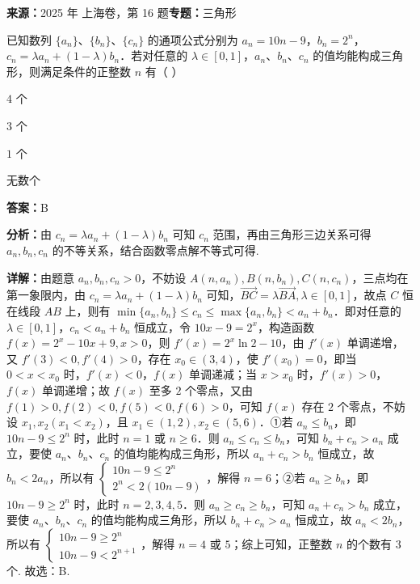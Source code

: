 \begin{question}[points=5]
\textbf{来源：}2025 年 上海卷，第 16 题\quad \textbf{专题：}三角形\par
已知数列 $\{a_n\}$、$\{b_n\}$、$\{c_n\}$ 的通项公式分别为 $a_n = 10n - 9$，$b_n = 2^n$，$c_n = \lambda a_n + (1-\lambda)b_n$．若对任意的 $\lambda \in [0,1]$，$a_n$、$b_n$、$c_n$ 的值均能构成三角形，则满足条件的正整数 $n$ 有（ ）
\begin{choices}
  \item $4$ 个
  \item $3$ 个
  \item $1$ 个
  \item 无数个
\end{choices}
\begin{solution}
\textbf{答案：}B

\textbf{分析：}由 $c_n = \lambda a_n + (1-\lambda)b_n$ 可知 $c_n$ 范围，再由三角形三边关系可得 $a_n, b_n, c_n$ 的不等关系，结合函数零点解不等式可得.

\textbf{详解：}由题意 $a_n, b_n, c_n > 0$，不妨设 $A(n, a_n), B(n, b_n), C(n, c_n)$，三点均在第一象限内，由 $c_n = \lambda a_n + (1-\lambda)b_n$ 可知，$\overrightarrow{BC} = \lambda \overrightarrow{BA}, \lambda \in [0,1]$，故点 $C$ 恒在线段 $AB$ 上，则有 $\min\{a_n, b_n\} \leq c_n \leq \max\{a_n, b_n\} < a_n + b_n$．即对任意的 $\lambda \in [0,1]$，$c_n < a_n + b_n$ 恒成立，令 $10x - 9 = 2^x$，构造函数 $f(x) = 2^x - 10x + 9, x > 0$，则 $f'(x) = 2^x \ln 2 - 10$，由 $f'(x)$ 单调递增，又 $f'(3) < 0, f'(4) > 0$，存在 $x_0 \in (3,4)$，使 $f'(x_0) = 0$，即当 $0 < x < x_0$ 时，$f'(x) < 0$，$f(x)$ 单调递减；当 $x > x_0$ 时，$f'(x) > 0$，$f(x)$ 单调递增；故 $f(x)$ 至多 $2$ 个零点，又由 $f(1) > 0, f(2) < 0, f(5) < 0, f(6) > 0$，可知 $f(x)$ 存在 $2$ 个零点，不妨设 $x_1, x_2 (x_1 < x_2)$，且 $x_1 \in (1,2), x_2 \in (5,6)$．①若 $a_n \leq b_n$，即 $10n - 9 \leq 2^n$ 时，此时 $n = 1$ 或 $n \geq 6$．则 $a_n \leq c_n \leq b_n$，可知 $b_n + c_n > a_n$ 成立，要使 $a_n$、$b_n$、$c_n$ 的值均能构成三角形，所以 $a_n + c_n > b_n$ 恒成立，故 $b_n < 2a_n$，所以有 $\begin{cases} 10n - 9 \leq 2^n \\ 2^n < 2(10n - 9) \end{cases}$，解得 $n = 6$；②若 $a_n \geq b_n$，即 $10n - 9 \geq 2^n$ 时，此时 $n = 2,3,4,5$．则 $a_n \geq c_n \geq b_n$，可知 $a_n + c_n > b_n$ 成立，要使 $a_n$、$b_n$、$c_n$ 的值均能构成三角形，所以 $b_n + c_n > a_n$ 恒成立，故 $a_n < 2b_n$，所以有 $\begin{cases} 10n - 9 \geq 2^n \\ 10n - 9 < 2^{n+1} \end{cases}$，解得 $n = 4$ 或 $5$；综上可知，正整数 $n$ 的个数有 $3$ 个. 故选：B.
\end{solution}
\end{question}

